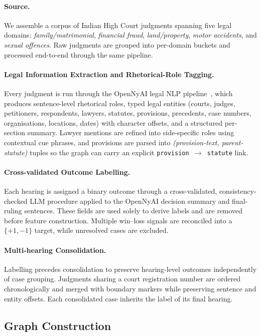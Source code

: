 \documentclass[runningheads]{llncs}
\begin{document}
\paragraph{Source.}
We assemble a corpus of Indian High Court judgments spanning five legal domains: \emph{family/matrimonial}, \emph{financial fraud}, \emph{land/property}, \emph{motor accidents}, and \emph{sexual offences}. Raw judgments are grouped into per-domain buckets and processed end-to-end through the same pipeline.

\paragraph{Legal Information Extraction and Rhetorical-Role Tagging.} Every judgment is run through the OpenNyAI legal NLP pipeline~\cite{kalamkar2022opennyai}, which produces sentence-level rhetorical roles, typed legal entities (courts, judges, petitioners, respondents, lawyers, statutes, provisions, precedents, case numbers, organisations, locations, dates) with character offsets, and a structured per-section summary. Lawyer mentions are refined into side-specific roles using contextual cue phrases, and provisions are parsed into \emph{(provision-text, parent-statute)} tuples so the graph can carry an explicit \texttt{provision $\rightarrow$ statute} link.

\paragraph{Cross-validated Outcome Labelling.}
Each hearing is assigned a binary outcome through a
cross-validated, consistency-checked LLM procedure applied to the OpenNyAI
decision summary and final-ruling sentences. These fields are used solely
to derive labels and are removed before feature construction. Multiple
win--loss signals are reconciled into a $\{+1,-1\}$ target, while unresolved
cases are excluded.

\paragraph{Multi-hearing Consolidation.}
Labelling precedes consolidation to preserve hearing-level
outcomes independently of case grouping. Judgments sharing a court
registration number are ordered chronologically and merged with boundary
markers while preserving sentence and entity offsets. Each consolidated
case inherits the label of its final hearing.

\subsection{Graph Construction}
\label{subsec:pipeline-graph}
\end{document}
